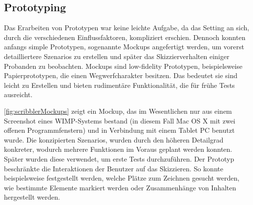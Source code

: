 \subsection{Prototyping}
Das Erarbeiten von Prototypen war keine leichte Aufgabe, da das Setting an sich, durch die verschiedenen Einflussfaktoren, kompliziert erschien. Dennoch konnten anfangs simple Prototypen, sogenannte Mockups angefertigt werden, um vorerst detailliertere Szenarios zu erstellen und später das Skizzierverhalten einiger Probanden zu beobachten. Mockups sind low-fidelity Prototypen, beispielsweise Papierprototypen, die einen Wegwerfcharakter besitzen. Das bedeutet sie sind leicht zu Erstellen und bieten rudimentäre Funktionalität, die für frühe Tests ausreicht.

\medskip \autoref{fig:scribblerMockups} zeigt ein Mockup, das im Wesentlichen nur aus einem Screenshot eines \acs{WIMP}-Systems bestand (in diesem Fall Mac OS X mit zwei offenen Programmfenstern) und in Verbindung mit einem Tablet PC benutzt wurde. Die konzipierten Szenarios, wurden durch den höheren Detailgrad konkreter, wodurch mehrere Funktionen im Voraus geplant werden konnten. Später wurden diese verwendet, um erste Tests durchzuführen. Der Prototyp beschränkte die Interaktionen der Benutzer auf das Skizzieren. So konnte beispielsweise festgestellt werden, welche Plätze zum Zeichnen gesucht werden, wie bestimmte Elemente markiert werden oder Zusammenhänge von Inhalten hergestellt werden.

